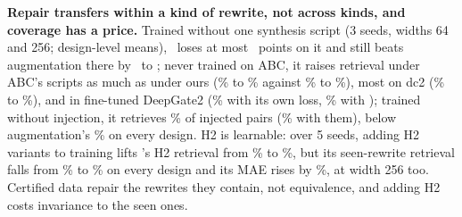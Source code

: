 \noindent\textbf{Repair transfers within a kind of rewrite, not across kinds, and coverage has a price.} Trained
without one synthesis script (3 seeds, widths 64 and 256; design-level means), \ours\ loses at most \TwSynCostMax\ points on it and still beats
augmentation there by \TwSynVsAugMin\ to \TwSynVsAugMax; never trained on ABC, it raises retrieval under ABC's scripts as much as
under ours (\AbcBaseTop\% to \AbcOursTop\% against \AbcBaseTopSyn\% to \AbcOursTopSyn\%), most on dc2 (\AbcBaseTopDc\% to \AbcOursTopDc\%), and in
fine-tuned DeepGate2 (\AbcFtCtrlTop\% with its own loss, \AbcFtEqTop\% with \ours); trained without injection, it retrieves \TwInjOurs\% of injected pairs
(\TwInjFull\% with them), below augmentation's \TwInjAug\% on every design. H2 is
learnable: over 5 seeds, adding H2 variants to training lifts \ours's H2 retrieval from \NineEqHTwoBefore\% to
\NineEqHTwoAfter\%, but its seen-rewrite retrieval falls from
\NineEqSeenBefore\% to \NineEqSeenAfter\% on every design and its MAE rises by \NineEqMaePct\%, at width 256 too. Certified data repair the
rewrites they contain, not equivalence, and adding H2 costs invariance to the seen ones.



